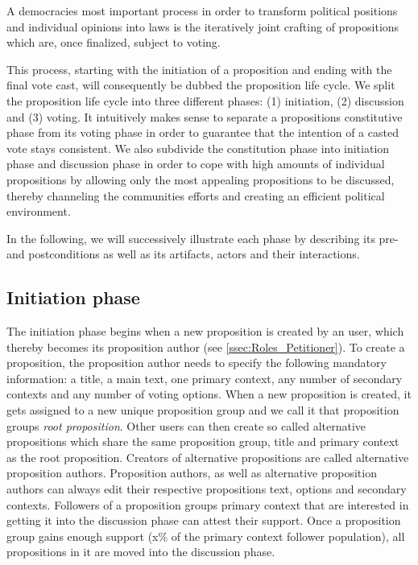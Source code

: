 A democracies most important process in order to transform political positions and individual opinions into laws is the iteratively joint crafting of propositions which are, once finalized, subject to voting.

This process, starting with the initiation of a proposition and ending with the final vote cast, will consequently be dubbed the proposition life cycle.
We split the proposition life cycle into three different phases: (1) initiation, (2) discussion and (3) voting.
It intuitively makes sense to separate a propositions constitutive phase from its voting phase in order to guarantee that the intention of a casted vote stays consistent.
We also subdivide the constitution phase into initiation phase and discussion phase in order to cope with high amounts of individual propositions by allowing only the most appealing propositions to be discussed, thereby channeling the communities efforts and creating an efficient political environment.

In the following, we will successively illustrate each phase by describing its pre- and postconditions as well as its artifacts, actors and their interactions.

\subsection{Initiation phase}
\label{ssec:Lifecycle_Initiation}

The initiation phase begins when a new proposition is created by an user, which thereby becomes its proposition author (see \ref{ssec:Roles_Petitioner}).
To create a proposition, the proposition author needs to specify the following mandatory information: a title, a main text, one primary context, any number of secondary contexts and any number of voting options.
When a new proposition is created, it gets assigned to a new unique proposition group and we call it that proposition groups \emph{root proposition}.
Other users can then create so called alternative propositions which share the same proposition group, title and primary context as the root proposition.
Creators of alternative propositions are called alternative proposition authors.
Proposition authors, as well as alternative proposition authors can always edit their respective propositions text, options and secondary contexts.
Followers of a proposition groups primary context that are interested in getting it into the discussion phase can attest their support.
Once a proposition group gains enough support (x\% of the primary context follower population), all propositions in it are moved into the discussion phase.

